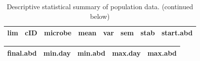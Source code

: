 \documentclass[]{article}
\begin{document}
\begin{longtable}[]{@{}llllllll@{}}
\caption{Descriptive statistical summary of population data. (continued
below)}\tabularnewline
\toprule
\begin{minipage}[t]{0.08\columnwidth}\raggedright\strut
\textbf{lim}
\strut\end{minipage} &
\begin{minipage}[t]{0.08\columnwidth}\raggedright\strut
\textbf{cID}
\strut\end{minipage} &
\begin{minipage}[t]{0.13\columnwidth}\raggedright\strut
\textbf{microbe}
\strut\end{minipage} &
\begin{minipage}[t]{0.09\columnwidth}\raggedright\strut
\textbf{mean}
\strut\end{minipage} &
\begin{minipage}[t]{0.08\columnwidth}\raggedright\strut
\textbf{var}
\strut\end{minipage} &
\begin{minipage}[t]{0.08\columnwidth}\raggedright\strut
\textbf{sem}
\strut\end{minipage} &
\begin{minipage}[t]{0.09\columnwidth}\raggedright\strut
\textbf{stab}
\strut\end{minipage} &
\begin{minipage}[t]{0.14\columnwidth}\raggedright\strut
\textbf{start.abd}
\strut\end{minipage}\tabularnewline
\bottomrule
\end{longtable}

\begin{longtable}[]{@{}lllll@{}}
\toprule
\begin{minipage}[t]{0.17\columnwidth}\raggedright\strut
\textbf{final.abd}
\strut\end{minipage} &
\begin{minipage}[t]{0.14\columnwidth}\raggedright\strut
\textbf{min.day}
\strut\end{minipage} &
\begin{minipage}[t]{0.14\columnwidth}\raggedright\strut
\textbf{min.abd}
\strut\end{minipage} &
\begin{minipage}[t]{0.14\columnwidth}\raggedright\strut
\textbf{max.day}
\strut\end{minipage} &
\begin{minipage}[t]{0.14\columnwidth}\raggedright\strut
\textbf{max.abd}
\strut\end{minipage}\tabularnewline
\bottomrule
\end{longtable}
\end{document}
